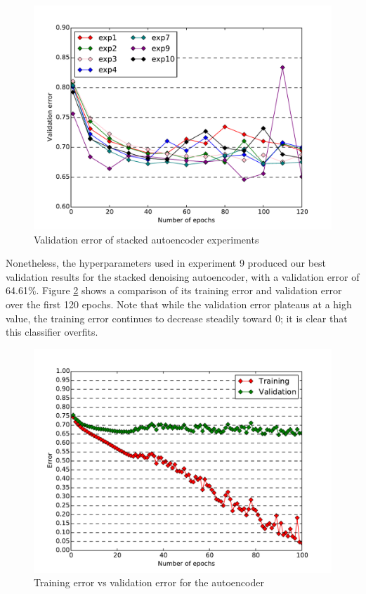 \documentclass{acm_proc_article-sp}
\begin{document}
\begin{figure}[h!]
\includegraphics[width=\linewidth]{autoencoder_compare.pdf}
		\caption{Validation error of stacked autoencoder experiments}
		\label{fig:autoencoder_compare}
\end{figure}

Nonetheless, the hyperparameters used in experiment 9 produced our best validation results for the stacked denoising autoencoder, with a validation error of 64.61\%. Figure \ref{fig:autoencoder_trainvsvalid} shows a comparison of its training error and validation error over the first 120 epochs. Note that while the validation error plateaus at a high value, the training error continues to decrease steadily toward 0; it is clear that this classifier overfits.

\begin{figure}[h!]
\includegraphics[width=\linewidth]{autoencoder_learning.pdf}
		\caption{Training error vs validation error for the autoencoder}
		\label{fig:autoencoder_trainvsvalid}
\end{figure}
\end{document}
